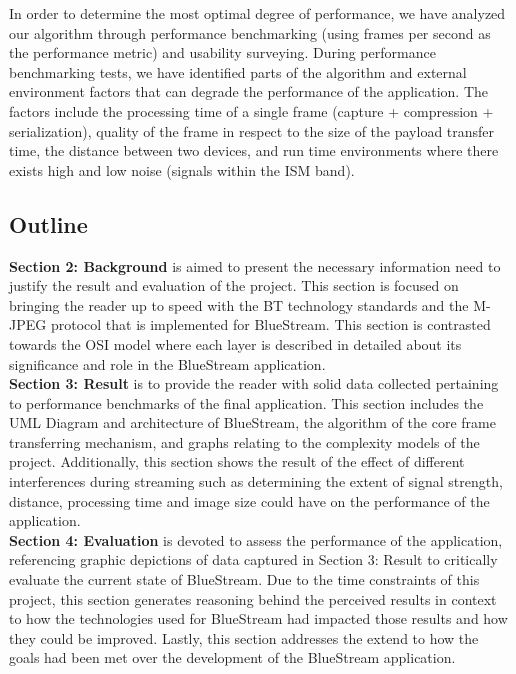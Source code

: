 \documentclass[a4paper,12pt]{article}
\begin{document}
In order to determine the most optimal degree of performance, we have analyzed our algorithm through performance benchmarking (using frames per second as the performance metric) and usability surveying. During performance benchmarking tests, we have identified parts of the algorithm and external environment factors that can degrade the performance of the application. The factors include the processing time of a single frame (capture + compression + serialization), quality of the frame in respect to the size of the payload transfer time, the distance between two devices, and run time environments where there exists high and low noise (signals within the ISM band). 

\subsection{Outline}
\textbf{Section 2: Background} is aimed to present the necessary information need to justify the result and evaluation of the project. This section is focused on bringing the reader up to speed with the BT technology standards and the M-JPEG protocol that is implemented for BlueStream. This section is contrasted towards the OSI model where each layer is described in detailed about its significance and role in the BlueStream application. \\

\noindent\textbf{Section 3: Result} is to provide the reader with solid data collected pertaining to performance benchmarks of the final application. This section includes the UML Diagram and architecture of BlueStream, the algorithm of the core frame transferring mechanism, and graphs relating to the complexity models of the project. Additionally, this section shows the result of the effect of different interferences during streaming such as determining the extent of signal strength, distance, processing time and image size could have on the performance of the application.\\

\noindent\textbf{Section 4: Evaluation} is devoted to assess the performance of the application, referencing graphic depictions of data captured in Section 3: Result to critically evaluate the current state of BlueStream. Due to the time constraints of this project, this section generates reasoning behind the perceived results in context to how the technologies used for BlueStream had impacted those results and how they could be improved. Lastly, this section addresses the extend to how the goals had been met over the development of the BlueStream application.  \\
\end{document}
